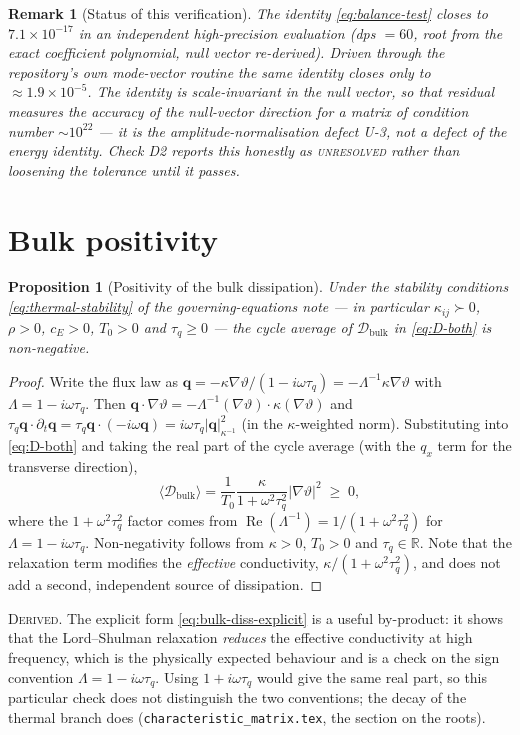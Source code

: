 \documentclass[11pt]{article}
\newcommand{\bth}{\vartheta}
\newcommand{\bq}{\bm{q}}
\newcommand{\Lam}{\Lambda}
\theoremstyle{plain}
\newtheorem{proposition}{Proposition}
\newtheorem{remark}{Remark}
\begin{document}
\begin{remark}[Status of this verification]
\label{rem:balance-status}
The identity \eqref{eq:balance-test} closes to $7.1\times10^{-17}$ in an
independent high-precision evaluation (dps $=60$, root from the exact coefficient
polynomial, null vector re-derived). Driven through the repository's own
mode-vector routine the same identity closes only to $\approx1.9\times10^{-5}$.
The identity is scale-invariant in the null vector, so that residual measures the
accuracy of the null-vector \emph{direction} for a matrix of condition number
$\sim10^{22}$ --- it is the amplitude-normalisation defect U-3, not a defect of
the energy identity. Check D2 reports this honestly as \textsc{unresolved} rather
than loosening the tolerance until it passes.
\end{remark}

\section{Bulk positivity}
\label{sec:positivity}

\begin{proposition}[Positivity of the bulk dissipation]
\label{prop:positivity}
Under the stability conditions \eqref{eq:thermal-stability} of the
governing-equations note --- in particular $\kappa_{ij}\succ0$, $\rho>0$,
$c_E>0$, $T_0>0$ and $\tau_q\ge0$ --- the cycle average of
$\mathcal{D}_{\text{bulk}}$ in \eqref{eq:D-both} is non-negative.
\end{proposition}
\begin{proof}
Write the flux law as
$\bq = -\kappa\nabla\bth/(1-i\omega\tau_q) = -\Lam^{-1}\kappa\nabla\bth$ with
$\Lam = 1-i\omega\tau_q$. Then
$\bq\cdot\nabla\bth = -\Lam^{-1}(\nabla\bth)\cdot\kappa(\nabla\bth)$ and
$\tau_q\bq\cdot\partial_t\bq = \tau_q\bq\cdot(-i\omega\bq)
= i\omega\tau_q\lvert\bq\rvert^2_{\kappa^{-1}}$ (in the $\kappa$-weighted norm).
Substituting into \eqref{eq:D-both} and taking the real part of the cycle
average (with the $q_x$ term for the transverse direction),
\begin{equation}
  \langle\mathcal{D}_{\text{bulk}}\rangle
  = \frac{1}{T_0}\frac{\kappa}{1+\omega^2\tau_q^2}
    \big\lvert\nabla\bth\big\rvert^2 \;\ge\;0 ,
  \label{eq:bulk-diss-explicit}
\end{equation}
where the $1+\omega^2\tau_q^2$ factor comes from
$\operatorname{Re}(\Lam^{-1}) = 1/(1+\omega^2\tau_q^2)$ for
$\Lam=1-i\omega\tau_q$. Non-negativity follows from $\kappa>0$, $T_0>0$ and
$\tau_q\in\mathbb{R}$. Note that the relaxation term modifies the \emph{effective}
conductivity, $ \kappa/(1+\omega^2\tau_q^2)$, and does not add a second,
independent source of dissipation.
\end{proof}
\textsc{Derived}. The explicit form \eqref{eq:bulk-diss-explicit} is a useful
by-product: it shows that the Lord--Shulman relaxation \emph{reduces} the
effective conductivity at high frequency, which is the physically expected
behaviour and is a check on the sign convention $\Lam = 1-i\omega\tau_q$. Using
$1+i\omega\tau_q$ would give the same real part, so this particular check does not
distinguish the two conventions; the decay of the thermal branch does
(\texttt{characteristic\_matrix.tex}, the section on the roots).
\end{document}
